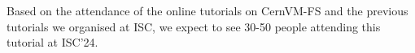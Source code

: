 Based on the attendance of the online tutorials on CernVM-FS and the previous tutorials we organised at ISC,
we expect to see 30-50 people attending this tutorial at ISC'24.







